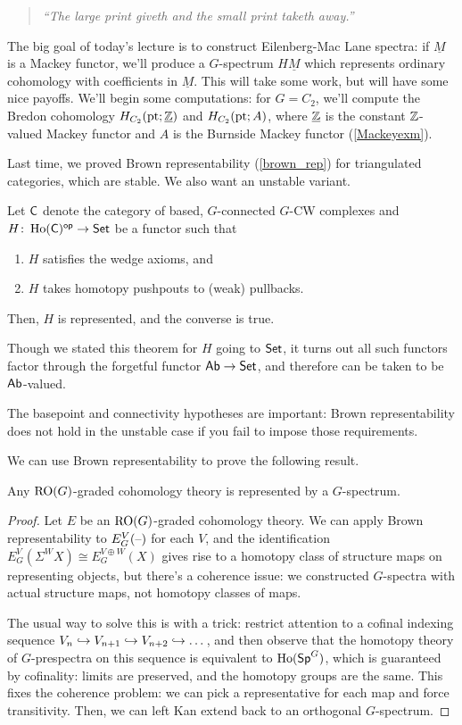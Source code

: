\begin{quote}\textit{
	``The large print giveth and the small print taketh away.''
}\end{quote}
The big goal of today's lecture is to construct Eilenberg-Mac Lane spectra: if $\underline M$ is a Mackey functor,
we'll produce a $G$-spectrum $H\underline M$ which represents ordinary cohomology with coefficients in $\underline
M$. This will take some work, but will have some nice payoffs. We'll begin some computations: for $G = C_2$, we'll
compute the Bredon cohomology $H_{C_2}(\mathrm{pt};\underline{\mathbb Z})$ and $H_{C_2}(\mathrm{pt};A)$, where $\underline{\mathbb Z}$ is the
constant $\mathbb Z$-valued Mackey functor and $A$ is the Burnside Mackey functor (\cref{Mackeyexm}).

Last time, we proved Brown representability (\cref{brown_rep}) for triangulated categories, which are stable. We
also want an unstable variant.
\begin{thm}
Let $\mathsf C$ denote the category of based, $G$-connected $G$-CW complexes and $H\colon \operatorname{Ho}(\mathsf C)^{\mathsf{op}}\to\mathsf{Set}$ be a
functor such that
\begin{enumerate}
	\item $H$ satisfies the wedge axioms, and
	\item $H$ takes homotopy pushpouts to (weak) pullbacks.
\end{enumerate}
Then, $H$ is represented, and the converse is true.
\end{thm}
Though we stated this theorem for $H$ going to $\mathsf{Set}$, it turns out all such functors factor through the forgetful
functor $\mathsf{Ab}\to\mathsf{Set}$, and therefore can be taken to be $\mathsf{Ab}$-valued.
\begin{warn}
The basepoint and connectivity hypotheses are important: Brown representability does not hold in the unstable case
if you fail to impose those requirements.
\end{warn}
We can use Brown representability to prove the following result.
\begin{prop}
Any $\mathrm{RO}(G)$-graded cohomology theory is represented by a $G$-spectrum.
\end{prop}
\begin{proof}
Let $E$ be an $\mathrm{RO}(G)$-graded cohomology theory. We can apply Brown representability to $E_G^V(\text{--})$ for each $V$,
and the identification $E_G^V(\Sigma^W X)\cong E_G^{V\oplus W}(X)$ gives rise to a homotopy class of structure maps
on representing objects, but there's a coherence issue: we constructed $G$-spectra with actual structure maps, not
homotopy classes of maps.

The usual way to solve this is with a trick: restrict attention to a cofinal indexing sequence $V_n\hookrightarrow V_{n+1}\hookrightarrow
V_{n+2}\hookrightarrow\dots$, and then observe that the homotopy theory of $G$-prespectra on this sequence is equivalent to
$\operatorname{Ho}(\mathsf{Sp}^G)$, which is guaranteed by cofinality: limits are preserved, and the homotopy groups are the same. This
fixes the coherence problem: we can pick a representative for each map and force transitivity. Then, we can left
Kan extend back to an orthogonal $G$-spectrum.
\end{proof}
